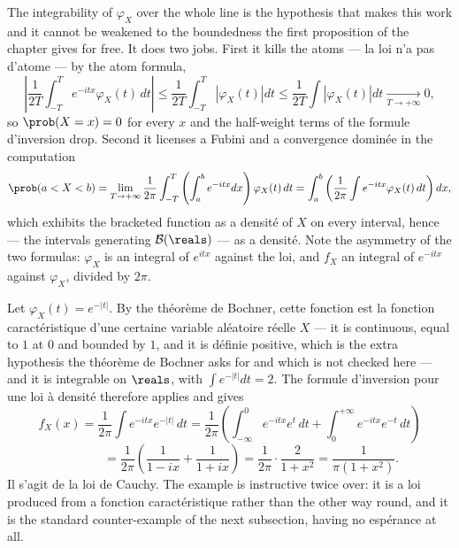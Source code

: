 \begin{remark}
The integrability of $\varphi_{X}$ over the whole line is the hypothesis that makes this
work and it cannot be weakened to the boundedness the first proposition of the chapter gives
for free. It does two jobs. First it kills the atoms --- la loi n'a pas d'atome --- by the
atom formula,
\[
  \left|\frac{1}{2T}\int_{-T}^{T}e^{-itx}\varphi_{X}(t)\,dt\right| \leq
  \frac{1}{2T}\int_{-T}^{T}\left|\varphi_{X}(t)\right|dt \leq \frac{1}{2T}\int
  \left|\varphi_{X}(t)\right|dt \xrightarrow[T \to +\infty]{} 0,
\]
so $\prob(X = x) = 0$ for every $x$ and the half-weight terms of the formule d'inversion drop.
Second it licenses a Fubini and a convergence dominée in the computation
\[
  \prob(a < X < b) = \lim_{T\to+\infty}
  \frac{1}{2\pi}\int_{-T}^{T}\left(\int_{a}^{b}e^{-itx}dx\right)\varphi_{X}(t)\,dt =
  \int_{a}^{b}\left(\frac{1}{2\pi}\int e^{-itx}\varphi_{X}(t)\,dt\right)dx,
\]
which exhibits the bracketed function as a densité of $X$ on every interval, hence --- the
intervals generating $\mathcal{B}(\reals)$ --- as a densité. Note the asymmetry of the two
formulas: $\varphi_{X}$ is an integral of $e^{itx}$ against the loi, and $f_{X}$ an integral
of $e^{-itx}$ against $\varphi_{X}$, divided by $2\pi$.
\end{remark}

\begin{example}
Let $\varphi_{X}(t) = e^{-|t|}$. By the théorème de Bochner, cette fonction est la fonction
caractéristique d'une certaine variable aléatoire réelle $X$ --- it is continuous, equal to $1$
at $0$ and bounded by $1$, and it is définie positive, which is the extra hypothesis the
théorème de Bochner asks for and which is not checked here --- and it is integrable on
$\reals$, with $\int e^{-|t|}dt = 2$. The formule d'inversion pour une loi à densité therefore
applies and gives
\[
  f_{X}(x) = \frac{1}{2\pi}\int e^{-itx}e^{-|t|}\,dt =
  \frac{1}{2\pi}\left(\int_{-\infty}^{0} e^{-itx}e^{t}\,dt + \int_{0}^{+\infty}
  e^{-itx}e^{-t}\,dt\right)
\]
\[
  \phantom{f_{X}(x)} = \frac{1}{2\pi}\left(\frac{1}{1 - ix} + \frac{1}{1 + ix}\right) =
  \frac{1}{2\pi}\cdot\frac{2}{1 + x^{2}} = \frac{1}{\pi\left(1 + x^{2}\right)}.
\]
Il s'agit de la loi de Cauchy. The example is instructive twice
over: it is a loi produced from a fonction caractéristique rather than the other way round,
and it is the standard counter-example of the next subsection, having no espérance at all.
\end{example}

